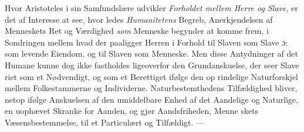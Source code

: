 \documentclass[12pt,a4paper]{book}
\begin{document}
Hvor Aristoteles i sin Samfundslære udvikler \emph{Forholdet
mellem Herre og Slave}, er det af Interesse at see, hvor\-%
ledes \emph{Humanitetens} Begreb, Anerkjendelsen af Menneskets
Ret og Værdighed \emph{som} Menneske begynder at komme frem,
i Sondringen mellem hvad der paaligger Herren i Forhold til
Slaven som Slave ɔ: som levende Eiendom, og til Slaven som
Menneske. Men disse Antydninger af det Humane kunne dog
ikke fastholdes ligeoverfor den Grundanskuelse, der seer Slave\-%
riet som et Nødvendigt, og som et Berettiget ifølge den op\-%
rindelige Naturforskjel mellem Folkestammerne og Individerne.
Naturbestemthedens Tilfældighed bliver, netop ifølge Anskuelsen
af den umiddelbare Enhed af det Aandelige og Naturlige, en
uophævet Skranke for Aanden, og gjør Aandsfriheden, Menne\-%
skets Væsensbestemmelse, til et Particulært og Tilfældigt. ---
\end{document}
